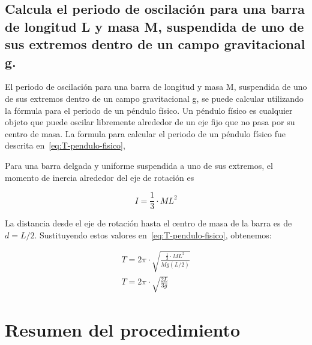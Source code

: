 \documentclass[twocolumn, 12pt]{article}
\begin{document}
\subsection{Calcula el periodo de oscilación para una barra de longitud L y masa M, suspendida de uno de
    sus extremos dentro de un campo gravitacional g.}

El periodo de oscilación para una barra de longitud y masa
M, suspendida de uno de sus extremos dentro de un campo
gravitacional g, se puede calcular utilizando la fórmula
para el periodo de un péndulo físico. Un péndulo físico es
cualquier objeto que puede oscilar libremente alrededor de
un eje fijo que no pasa por su centro de masa. La formula
para calcular el periodo de un péndulo físico fue descrita
en~\ref{eq:T-pendulo-fisico},

Para una barra delgada y uniforme suspendida a uno de sus
extremos, el momento de inercia alrededor del eje de
rotación es

    {\large
        \begin{equation}
            I = \frac{1}{3}\cdot M L^{2}
            \label{eq:momento-inercia-barra-delgada}
        \end{equation}
    }

La distancia desde el eje de rotación hasta el centro de
masa de la barra es de $d = L / 2$. Sustituyendo estos
valores en~\ref{eq:T-pendulo-fisico}, obtenemos:

{\large
\begin{equation}
    \begin{gathered}
        T = 2\pi \cdot \sqrt{\frac{\frac{1}{3}\cdot M L^{2}}{M g (L / 2) }} \\
        T = 2\pi \cdot \sqrt{\frac{2L}{3g}}
    \end{gathered}
\end{equation}
}

\section{Resumen del procedimiento}

\printbibliography
\end{document}
